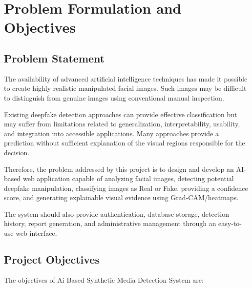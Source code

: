 \documentclass[12pt,a4paper,oneside]{report}
\begin{document}
\chapter{Problem Formulation and Objectives}

\section{Problem Statement}

The availability of advanced artificial intelligence techniques has made it possible to create highly realistic manipulated facial images. Such images may be difficult to distinguish from genuine images using conventional manual inspection.

Existing deepfake detection approaches can provide effective classification but may suffer from limitations related to generalization, interpretability, usability, and integration into accessible applications. Many approaches provide a prediction without sufficient explanation of the visual regions responsible for the decision.

Therefore, the problem addressed by this project is to design and develop an AI-based web application capable of analyzing facial images, detecting potential deepfake manipulation, classifying images as Real or Fake, providing a confidence score, and generating explainable visual evidence using Grad-CAM/heatmaps.

The system should also provide authentication, database storage, detection history, report generation, and administrative management through an easy-to-use web interface.

\section{Project Objectives}

The objectives of Ai Based Synthetic Media Detection System are:
\end{document}
